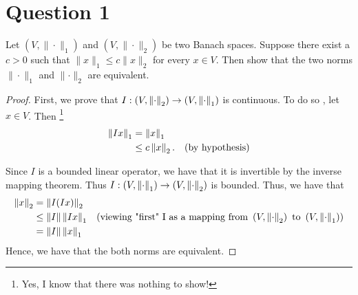 \section{Question 1}
\horz

Let $(V,\|\cdot\|_1)$  and $(V,\|\cdot\|_2)$ be two Banach spaces. Suppose there exist a $c>0$ such that $\|x\|_1 \leqslant c \|x\|_2$ for every $x\in V.$ Then show that the two norms $\|\cdot\|_1$ and $\lVert \cdot \rVert_2$ are equivalent.

\horz

\begin{proof}
    First, we prove that $I : \left( V, \left\lVert \cdot \right\rVert _{2} \right) \to \left( V, \left\lVert \cdot \right\rVert_{1} \right)$ is continuous. To do so , let $x \in V$. Then
    \footnote{Yes, I know that there was nothing to show!}
    \begin{align*}
	\left\lVert Ix \right\rVert_1 &= \left\lVert x \right\rVert_{1} \\
	&\le c \left\lVert x \right\rVert_{2}. & \text{(by hypothesis)}
    \end{align*}

    Since $I$ is a bounded linear operator, we have that it is invertible by the inverse mapping theorem. Thus $I : \left( V, \left\lVert \cdot \right\rVert_{1} \right) \to \left( V, \left\lVert \cdot \right\rVert_{2} \right)$ is bounded. Thus, we have that 
    \begin{align*}
	\left\lVert x \right\rVert_{2} &= \left\lVert I(Ix) \right\rVert_{2} \\
	&\le \left\lVert I \right\rVert \left\lVert Ix \right\rVert_{1} & \left(\text{viewing "first" I as a mapping from } \left( V, \left\lVert \cdot \right\rVert_{2} \right) \text{ to } \left( V, \left\lVert \cdot \right\rVert_{1} \right) \right) \\
	&= \left\lVert I \right\rVert \left\lVert x \right\rVert_{1}
    \end{align*}
    Hence, we have that the both norms are equivalent. 
\end{proof}
